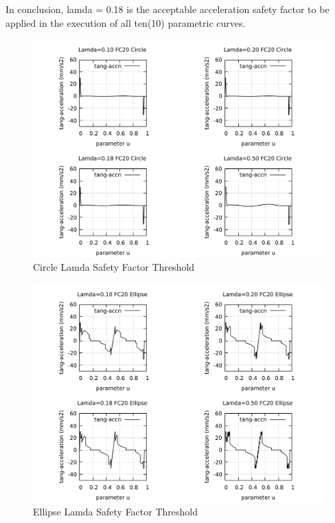 \noindent
In conclusion, lamda = 0.18 is the acceptable acceleration safety factor to be applied in the execution of all ten(10) parametric curves.\\
 
\clearpage
\pagebreak
\begin{landscape}
\begin{figure}
\centering
\caption  {Circle Lamda Safety Factor Threshold}
\label{img-Circle Lamda Safety Factor Threshold}
\includegraphics[width=1.30\textwidth]{Chap4/Lamda/img-4plots-CIRCLE-Lamda-010-018-020-050-FC20-Tang-Accn.pdf} 
\end{figure}
\end{landscape}


\clearpage
\pagebreak
\begin{landscape}
	\begin{figure}
		\centering
		\caption  {Ellipse Lamda Safety Factor Threshold}
		\label{img-Ellipse Lamda Safety Factor Threshold}
		\includegraphics[width=1.30\textwidth]{Chap4/Lamda/img-4plots-ELLIPSE-Lamda-010-018-020-050-FC20-Tang-Accn.pdf} 
	\end{figure}
\end{landscape}

